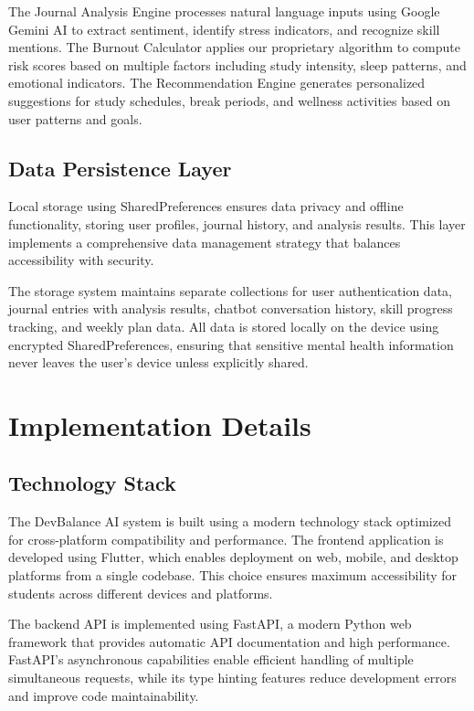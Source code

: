\documentclass[conference,10pt]{IEEEtran}
\begin{document}
The Journal Analysis Engine processes natural language inputs using Google Gemini AI to extract sentiment, identify stress indicators, and recognize skill mentions. The Burnout Calculator applies our proprietary algorithm to compute risk scores based on multiple factors including study intensity, sleep patterns, and emotional indicators. The Recommendation Engine generates personalized suggestions for study schedules, break periods, and wellness activities based on user patterns and goals.

\subsection{Data Persistence Layer}

Local storage using SharedPreferences ensures data privacy and offline functionality, storing user profiles, journal history, and analysis results. This layer implements a comprehensive data management strategy that balances accessibility with security.

The storage system maintains separate collections for user authentication data, journal entries with analysis results, chatbot conversation history, skill progress tracking, and weekly plan data. All data is stored locally on the device using encrypted SharedPreferences, ensuring that sensitive mental health information never leaves the user's device unless explicitly shared.

\section{Implementation Details}

\subsection{Technology Stack}

The DevBalance AI system is built using a modern technology stack optimized for cross-platform compatibility and performance. The frontend application is developed using Flutter, which enables deployment on web, mobile, and desktop platforms from a single codebase. This choice ensures maximum accessibility for students across different devices and platforms.

The backend API is implemented using FastAPI, a modern Python web framework that provides automatic API documentation and high performance. FastAPI's asynchronous capabilities enable efficient handling of multiple simultaneous requests, while its type hinting features reduce development errors and improve code maintainability.
\end{document}
